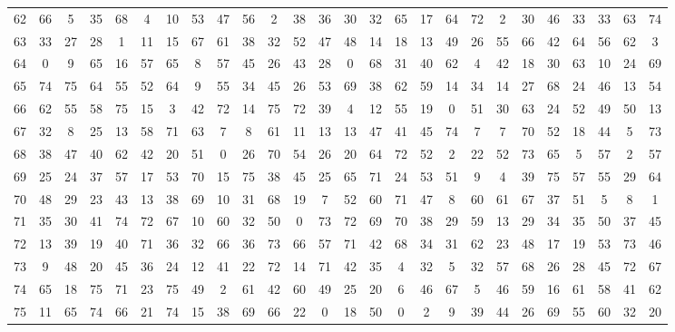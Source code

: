 \begin{table}
\begin{tabular}{c c c c c c c c c c c c c c c c c c c c c c c c c c }
62 & 66 & 5 & 35 & 68 & 4 & 10 & 53 & 47 & 56 & 2 & 38 & 36 & 30 & 32 & 65 & 17 & 64 & 72 & 2 & 30 & 46 & 33 & 33 & 63 & 74 \\
63 & 33 & 27 & 28 & 1 & 11 & 15 & 67 & 61 & 38 & 32 & 52 & 47 & 48 & 14 & 18 & 13 & 49 & 26 & 55 & 66 & 42 & 64 & 56 & 62 & 3 \\
64 & 0 & 9 & 65 & 16 & 57 & 65 & 8 & 57 & 45 & 26 & 43 & 28 & 0 & 68 & 31 & 40 & 62 & 4 & 42 & 18 & 30 & 63 & 10 & 24 & 69 \\
65 & 74 & 75 & 64 & 55 & 52 & 64 & 9 & 55 & 34 & 45 & 26 & 53 & 69 & 38 & 62 & 59 & 14 & 34 & 14 & 27 & 68 & 24 & 46 & 13 & 54 \\
66 & 62 & 55 & 58 & 75 & 15 & 3 & 42 & 72 & 14 & 75 & 72 & 39 & 4 & 12 & 55 & 19 & 0 & 51 & 30 & 63 & 24 & 52 & 49 & 50 & 13 \\
67 & 32 & 8 & 25 & 13 & 58 & 71 & 63 & 7 & 8 & 61 & 11 & 13 & 13 & 47 & 41 & 45 & 74 & 7 & 7 & 70 & 52 & 18 & 44 & 5 & 73 \\
68 & 38 & 47 & 40 & 62 & 42 & 20 & 51 & 0 & 26 & 70 & 54 & 26 & 20 & 64 & 72 & 52 & 2 & 22 & 52 & 73 & 65 & 5 & 57 & 2 & 57 \\
69 & 25 & 24 & 37 & 57 & 17 & 53 & 70 & 15 & 75 & 38 & 45 & 25 & 65 & 71 & 24 & 53 & 51 & 9 & 4 & 39 & 75 & 57 & 55 & 29 & 64 \\
70 & 48 & 29 & 23 & 43 & 13 & 38 & 69 & 10 & 31 & 68 & 19 & 7 & 52 & 60 & 71 & 47 & 8 & 60 & 61 & 67 & 37 & 51 & 5 & 8 & 1 \\
71 & 35 & 30 & 41 & 74 & 72 & 67 & 10 & 60 & 32 & 50 & 0 & 73 & 72 & 69 & 70 & 38 & 29 & 59 & 13 & 29 & 34 & 35 & 50 & 37 & 45 \\
72 & 13 & 39 & 19 & 40 & 71 & 36 & 32 & 66 & 36 & 73 & 66 & 57 & 71 & 42 & 68 & 34 & 31 & 62 & 23 & 48 & 17 & 19 & 53 & 73 & 46 \\
73 & 9 & 48 & 20 & 45 & 36 & 24 & 12 & 41 & 22 & 72 & 14 & 71 & 42 & 35 & 4 & 32 & 5 & 32 & 57 & 68 & 26 & 28 & 45 & 72 & 67 \\
74 & 65 & 18 & 75 & 71 & 23 & 75 & 49 & 2 & 61 & 42 & 60 & 49 & 25 & 20 & 6 & 46 & 67 & 5 & 46 & 59 & 16 & 61 & 58 & 41 & 62 \\
75 & 11 & 65 & 74 & 66 & 21 & 74 & 15 & 38 & 69 & 66 & 22 & 0 & 18 & 50 & 0 & 2 & 9 & 39 & 44 & 26 & 69 & 55 & 60 & 32 & 20 \\
\hline
\end{tabular}
\end{table}